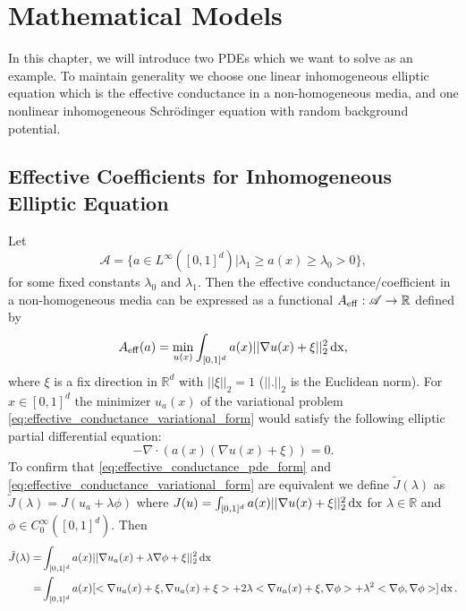 \chapter{Mathematical Models}
In this chapter, we will introduce two PDEs which we want to solve as an example. To maintain generality we choose one linear inhomogeneous elliptic equation which is the effective conductance in a non-homogeneous media, and one nonlinear inhomogeneous Schr\"{o}dinger equation with random background potential.
\section{Effective Coefficients for Inhomogeneous Elliptic Equation}
Let 
\begin{equation}
	\label{def:coefficient_field_for_effective_conductance}
	\mathscr{A} = \{a\in L^{\infty}([0,1]^d) | \lambda_{1} \geq a(x) \geq \lambda_{0} > 0 \},
\end{equation}
for some fixed constants $\lambda_{0}$ and $\lambda_{1}$. Then the effective conductance/coefficient in a non-homogeneous media can be expressed as a functional $A_{\operatorname{eff}} : \mathscr{A} \to \mathbb{R}$ defined by
\begin{equation}
	A_{\operatorname{eff}}(a) = \min_{u(x)} \int_{[0,1]^d} a(x) ||\nabla u(x) + \xi||_{2}^{2} \operatorname{dx}
	\label{eq:effective_conductance_variational_form},
\end{equation}
where $\xi$ is a fix direction in $\mathbb{R}^d$ with $||\xi||_{2} = 1$ ($||.||_{2}$ is the Euclidean norm).
For $x\in [0,1]^{d}$ the minimizer $u_{a}(x)$ of the variational problem \eqref{eq:effective_conductance_variational_form} would satisfy the following elliptic partial differential equation: 
\begin{equation}
	-\nabla \cdot (a(x)(\nabla u(x)+\xi)) = 0 
	\label{eq:effective_conductance_pde_form}.
\end{equation}
To confirm that \eqref{eq:effective_conductance_pde_form} and \eqref{eq:effective_conductance_variational_form} are equivalent we define $\tilde{J}(\lambda)$ as $\tilde{J}(\lambda) = J(u_{a}+\lambda\phi)$ where $J(u) = \int_{[0,1]^d} a(x) ||\nabla u(x) + \xi||_{2}^{2} \operatorname{dx} $ for $\lambda \in \mathbb{R}$ and $\phi \in C_{0}^{\infty}([0,1]^{d})$. Then 
\begin{equation}
	\begin{aligned}
		\tilde{J}(\lambda) = &\int_{[0,1]^d} a(x) ||\nabla u_{a}(x)+ \lambda\nabla\phi + \xi||_{2}^{2} \operatorname{dx} \\
		= &\int_{[0,1]^d} a(x) [<\nabla u_{a}(x)+\xi,\nabla u_{a}(x)+\xi> + 2\lambda<\nabla u_{a}(x)+\xi, \nabla\phi> + \lambda^{2} <\nabla\phi,\nabla\phi>] \operatorname{dx}.
	\end{aligned}\label{eq:Jtilda}
\end{equation}
